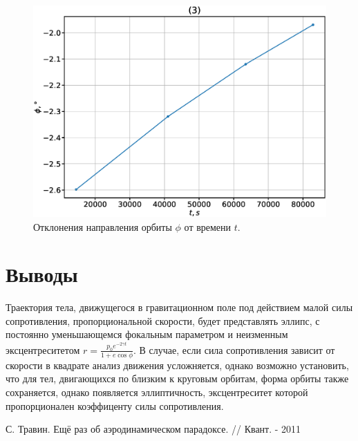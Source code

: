 \documentclass[12pt]{article}
\begin{document}
\begin{figure}[H]
      \includegraphics[width=1.0\linewidth]{phi_t_3.eps}
    \endminipage
    \caption{Отклонения направления орбиты $\phi$ от времени $t$.}
    \label{fig:8}
    \end{figure}

\section{Выводы}
Траектория тела, движущегося в гравитационном поле под действием малой силы сопротивления, пропорциональной скорости, будет представлять 
эллипс, с постоянно уменьшающемся фокальным параметром и неизменным эксцентреситетом $r = \frac{p_0e^{-2\gamma t}}{1 + e\cos{\phi}}$.
В случае, если сила сопротивления зависит от скорости в квадрате анализ движения усложняется, однако возможно установить, что 
для тел, двигающихся по близким к круговым орбитам, форма орбиты также сохраняется, однако появляется эллиптичность, эксцентреситет которой
пропорционален коэффиценту силы сопротивления. 

\begin{thebibliography}{9}
    С. Травин. Ещё раз об аэродинамическом парадоксе. // Квант. - 2011
\end{thebibliography}
\end{document}
